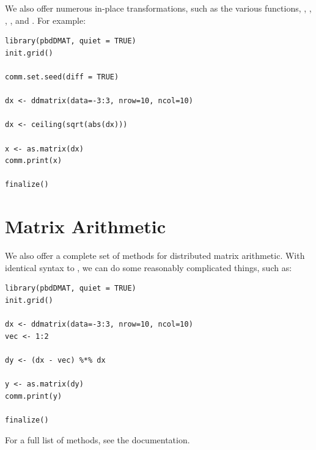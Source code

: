 We also offer numerous in-place transformations, such as the various  functions, , , , , and .  For example:

\begin{lstlisting}[language=rr,title=Transformations]
library(pbdDMAT, quiet = TRUE)
init.grid()

comm.set.seed(diff = TRUE)

dx <- ddmatrix(data=-3:3, nrow=10, ncol=10)

dx <- ceiling(sqrt(abs(dx)))

x <- as.matrix(dx)
comm.print(x)

finalize()
\end{lstlisting}





\section{Matrix Arithmetic}

We also offer a complete set of methods for distributed matrix arithmetic.  With identical syntax to , we can do some reasonably complicated things, such as:

\begin{lstlisting}[language=rr,title=Transformations]
library(pbdDMAT, quiet = TRUE)
init.grid()

dx <- ddmatrix(data=-3:3, nrow=10, ncol=10)
vec <- 1:2

dy <- (dx - vec) %*% dx

y <- as.matrix(dy)
comm.print(y)

finalize()
\end{lstlisting}

For a full list of methods, see the  documentation.


